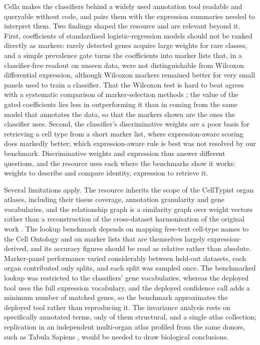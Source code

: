 \documentclass[11pt]{article}
\newcommand{\cella}{Cella}
\begin{document}
\cella{} makes the classifiers behind a widely used annotation tool readable and queryable without code, and pairs them with the expression summaries needed to interpret them. Two findings shaped the resource and are relevant beyond it. First, coefficients of standardised logistic-regression models should not be ranked directly as markers: rarely detected genes acquire large weights for rare classes, and a simple prevalence gate turns the coefficients into marker lists that, in a classifier-free readout on unseen data, were not distinguishable from Wilcoxon differential expression, although Wilcoxon markers remained better for very small panels used to train a classifier. That the Wilcoxon test is hard to beat agrees with a systematic comparison of marker-selection methods \cite{pullin2024}; the value of the gated coefficients lies less in outperforming it than in coming from the same model that annotates the data, so that the markers shown are the ones the classifier uses. Second, the classifier's discriminative weights are a poor basis for retrieving a cell type from a short marker list, where expression-aware scoring does markedly better; which expression-aware rule is best was not resolved by our benchmark. Discriminative weights and expression thus answer different questions, and the resource uses each where the benchmarks show it works: weights to describe and compare identity, expression to retrieve it.

Several limitations apply. The resource inherits the scope of the CellTypist organ atlases, including their tissue coverage, annotation granularity and gene vocabularies, and the relationship graph is a similarity graph over weight vectors rather than a reconstruction of the cross-dataset harmonisation of the original work \cite{xu2023}. The lookup benchmark depends on mapping free-text cell-type names to the Cell Ontology and on marker lists that are themselves largely expression-derived, and its accuracy figures should be read as relative rather than absolute. Marker-panel performance varied considerably between held-out datasets, each organ contributed only \pnSplitsPerOrgan{} splits, and each split was sampled once. The benchmarked lookup was restricted to the classifiers' gene vocabularies, whereas the deployed tool uses the full expression vocabulary, and the deployed confidence call adds a minimum number of matched genes, so the benchmark approximates the deployed tool rather than reproducing it. The invariance analysis rests on \invTierOne{} specifically annotated terms, only \invNRes{} of them structural, and a single atlas collection; replication in an independent multi-organ atlas profiled from the same donors, such as Tabula Sapiens \cite{tabulasapiens2022}, would be needed to draw biological conclusions.
\end{document}
